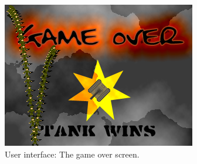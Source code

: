 \begin{figure}[ht]
\centering
\includegraphics[scale=0.6]{screenshots/16906.png}
\caption{User interface: The game over screen.}
\label{fig:gamescr4}
\end{figure}
